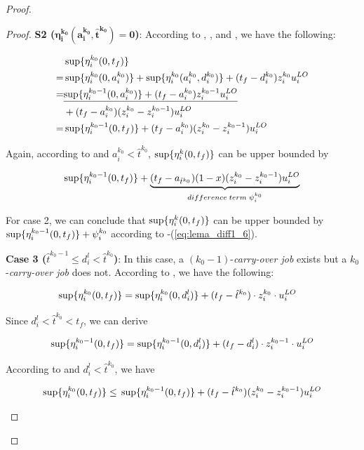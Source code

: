 \documentclass[10pt,journal,compsoc]{IEEEtran}
\begin{document}
\begin{proof}
\begin{proof}
\noindent\textbf{S2 ($\mathbf{\eta_i^{k_0}(a_i^{k_0},\hat{t}^{k_0})={0}}$)}:
According to  ,  , and , we have the following: 
\begin{footnotesize}
\begin{align*}
	&\sup\{\eta_i^{k_0}(0,t_f)\} \nonumber \\
=&\sup\{\eta_i^{k_0}(0,a_i^{k_0})\}+\sup\{\eta_i^{k_0}(a_i^{k_0},d_i^{k_0})\}+(t_f-d_i^{k_0})z_i^{k_0}u_i^{LO} \nonumber  \\
=&\underline{\sup\{\eta_i^{k_0-1}(0,a_i^{k_0})\}+(t_f-a_i^{k_0}){z_i^{k_0-1}}{u_i^{LO}}} \nonumber \\
&+(t_f-a_i^{k_0}){(z_i^{k_0}-z_i^{k_0-1})}{u_i^{LO}} \nonumber \\
=&\sup\{\eta_i^{k_0-1}(0,t_f)\}+(t_f-a_i^{k_0}){(z_i^{k_0}-z_i^{k_0-1})}{u_i^{LO}}
\end{align*}
\end{footnotesize}

Again, according to  and $a_i^{k_0}<\hat{t}^{k_0}$, $\sup\{\eta_i^{k}(0,t_f)\}$ can be upper bounded by
\begin{small}
\begin{align}
\sup\{\eta_i^{k_0-1}(0,t_f)\}+\underbrace{(t_f-a_{\hat{t}^{k_0}})(1-x)(z_i^{k_0}-z_i^{k_0-1}){u_i^{LO}}}_{difference\;term\;\psi_i^{k_0}}
\label{eq:lema_diff1_6}
\end{align}
\end{small}

For case 2, we can conclude that $\sup\{\eta_i^{k}(0,t_f)\}$ can be upper bounded by $\sup\{\eta_i^{k_0-1}(0,t_f)\}+\psi_i^{k_0}$ according to -(\ref{eq:lema_diff1_6}). 

\textbf{Case 3 (${\hat{t}^{k_0-1}\le{}d_i^{l}<\hat{t}^{k_0}}$)}: In this case, a $(k_0-1)$-\textit{carry-over job} exists but a $k_0$-\textit{carry-over job} does not. 
According to  , we have the following:
\begin{small}
\begin{align*}
\sup\{\eta_i^{k_0}(0,t_f)\}&=\sup\{\eta_i^{k_0}(0,d_i^{l})\}+(t_f-\hat{t}^{k_0})\cdot{}z_i^{k_0}\cdot{}u_i^{LO}
\end{align*} 
\end{small}
Since $d_i^{l}<\hat{t}^{k_0}<t_f$, we can derive
\begin{small}
\begin{align*}
\sup\{\eta_i^{k_0-1}(0,t_f)\}=\sup\{\eta_i^{k_0-1}(0,d_i^{l})\}+(t_f-d_i^{l})\cdot{}z_i^{k_0-1}\cdot{}u_i^{LO}
\end{align*} 
\end{small}
According to   and $d_i^{l}<\hat{t}^{k_0}$, we have
\begin{small}
\begin{align*}
\sup\{\eta_i^{k_0}(0,t_f)\}\le{}\sup\{\eta_i^{k_0-1}(0,t_f)\}+(t_f-\hat{t}^{k_0})(z_i^{k_0}-z_i^{k_0-1})u_i^{LO} 
\end{align*} 
\end{small}


\end{proof}
\end{proof}
\end{document}
